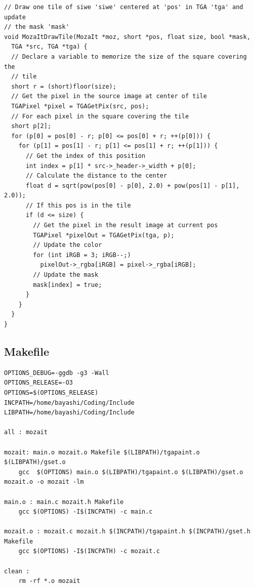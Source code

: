 \documentclass[12pt, a4paper]{article}
\begin{document}
\begin{scriptsize}
\begin{ttfamily}
\begin{lstlisting}
// Draw one tile of siwe 'siwe' centered at 'pos' in TGA 'tga' and update
// the mask 'mask'
void MozaItDrawTile(MozaIt *moz, short *pos, float size, bool *mask, 
  TGA *src, TGA *tga) {
  // Declare a variable to memorize the size of the square covering the 
  // tile
  short r = (short)floor(size);
  // Get the pixel in the source image at center of tile
  TGAPixel *pixel = TGAGetPix(src, pos);
  // For each pixel in the square covering the tile
  short p[2];
  for (p[0] = pos[0] - r; p[0] <= pos[0] + r; ++(p[0])) {
    for (p[1] = pos[1] - r; p[1] <= pos[1] + r; ++(p[1])) {
      // Get the index of this position
      int index = p[1] * src->_header->_width + p[0];
      // Calculate the distance to the center
      float d = sqrt(pow(pos[0] - p[0], 2.0) + pow(pos[1] - p[1], 2.0));
      // If this pos is in the tile
      if (d <= size) {
        // Get the pixel in the result image at current pos
        TGAPixel *pixelOut = TGAGetPix(tga, p);
        // Update the color
        for (int iRGB = 3; iRGB--;)
          pixelOut->_rgba[iRGB] = pixel->_rgba[iRGB];
        // Update the mask
        mask[index] = true;
      }
    }
  }
}
\end{lstlisting}
\end{ttfamily}
\end{scriptsize}

\subsection{Makefile}

\begin{scriptsize}
\begin{ttfamily}
\begin{lstlisting}
OPTIONS_DEBUG=-ggdb -g3 -Wall
OPTIONS_RELEASE=-O3 
OPTIONS=$(OPTIONS_RELEASE)
INCPATH=/home/bayashi/Coding/Include
LIBPATH=/home/bayashi/Coding/Include

all : mozait

mozait: main.o mozait.o Makefile $(LIBPATH)/tgapaint.o $(LIBPATH)/gset.o
	gcc  $(OPTIONS) main.o $(LIBPATH)/tgapaint.o $(LIBPATH)/gset.o mozait.o -o mozait -lm

main.o : main.c mozait.h Makefile
	gcc $(OPTIONS) -I$(INCPATH) -c main.c

mozait.o : mozait.c mozait.h $(INCPATH)/tgapaint.h $(INCPATH)/gset.h Makefile
	gcc $(OPTIONS) -I$(INCPATH) -c mozait.c

clean : 
	rm -rf *.o mozait
\end{lstlisting}
\end{ttfamily}
\end{scriptsize}
\end{document}
